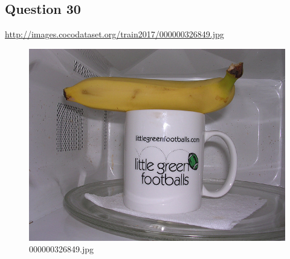 \subsection*{Question 30}
\url{http://images.cocodataset.org/train2017/000000326849.jpg}
    \begin{figure}[h]
        \centering
        \includegraphics[width=0.8\linewidth]{../image set/easy/000000326849.jpg}
        \caption{000000326849.jpg}
    \end{figure}
